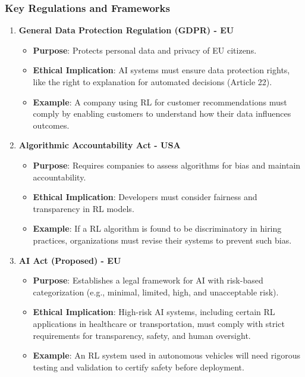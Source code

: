 \documentclass{beamer}
\begin{document}
\begin{frame}[fragile]
    \frametitle{Key Regulations and Frameworks}
    \begin{enumerate}
        \item \textbf{General Data Protection Regulation (GDPR) - EU}
        \begin{itemize}
            \item \textbf{Purpose}: Protects personal data and privacy of EU citizens.
            \item \textbf{Ethical Implication}: AI systems must ensure data protection rights, like the right to explanation for automated decisions (Article 22).
            \item \textbf{Example}: A company using RL for customer recommendations must comply by enabling customers to understand how their data influences outcomes.
        \end{itemize}

        \item \textbf{Algorithmic Accountability Act - USA}
        \begin{itemize}
            \item \textbf{Purpose}: Requires companies to assess algorithms for bias and maintain accountability.
            \item \textbf{Ethical Implication}: Developers must consider fairness and transparency in RL models.
            \item \textbf{Example}: If a RL algorithm is found to be discriminatory in hiring practices, organizations must revise their systems to prevent such bias.
        \end{itemize}

        \item \textbf{AI Act (Proposed) - EU}
        \begin{itemize}
            \item \textbf{Purpose}: Establishes a legal framework for AI with risk-based categorization (e.g., minimal, limited, high, and unacceptable risk).
            \item \textbf{Ethical Implication}: High-risk AI systems, including certain RL applications in healthcare or transportation, must comply with strict requirements for transparency, safety, and human oversight.
            \item \textbf{Example}: An RL system used in autonomous vehicles will need rigorous testing and validation to certify safety before deployment.
        \end{itemize}
    \end{enumerate}
\end{frame}
\end{document}
